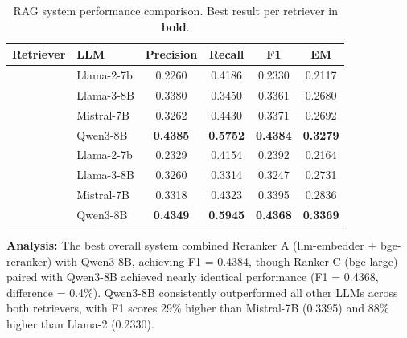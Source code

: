 \documentclass[10pt,twocolumn]{article}
\begin{document}
\begin{table}[t]
    \centering
    \caption{RAG system performance comparison. Best result per retriever in \textbf{bold}.}
    \label{tab:rag_results}
    \footnotesize
    \setlength{\tabcolsep}{2.6em}
    \begin{tabular}{llcccc}
        \toprule
        \textbf{Retriever} & \textbf{LLM} & \textbf{Precision} & \textbf{Recall} & \textbf{F1}     & \textbf{EM}     \\
        \midrule
                           & Llama-2-7b   & 0.2260             & 0.4186          & 0.2330          & 0.2117          \\
                           & Llama-3-8B   & 0.3380             & 0.3450          & 0.3361          & 0.2680          \\
                           & Mistral-7B   & 0.3262             & 0.4430          & 0.3371          & 0.2692          \\
                           & Qwen3-8B     & \textbf{0.4385}    & \textbf{0.5752} & \textbf{0.4384} & \textbf{0.3279} \\
        \midrule
                           & Llama-2-7b   & 0.2329             & 0.4154          & 0.2392          & 0.2164          \\
                           & Llama-3-8B   & 0.3260             & 0.3314          & 0.3247          & 0.2731          \\
                           & Mistral-7B   & 0.3318             & 0.4323          & 0.3395          & 0.2836          \\
                           & Qwen3-8B     & \textbf{0.4349}    & \textbf{0.5945} & \textbf{0.4368} & \textbf{0.3369} \\
        \bottomrule
    \end{tabular}
\end{table}

\textbf{Analysis:} The best overall system combined Reranker A (llm-embedder + bge-reranker) with Qwen3-8B, achieving F1 = 0.4384, though Ranker C (bge-large) paired with Qwen3-8B achieved nearly identical performance (F1 = 0.4368, difference = 0.4\%). Qwen3-8B consistently outperformed all other LLMs across both retrievers, with F1 scores 29\% higher than Mistral-7B (0.3395) and 88\% higher than Llama-2 (0.2330).
\end{document}
